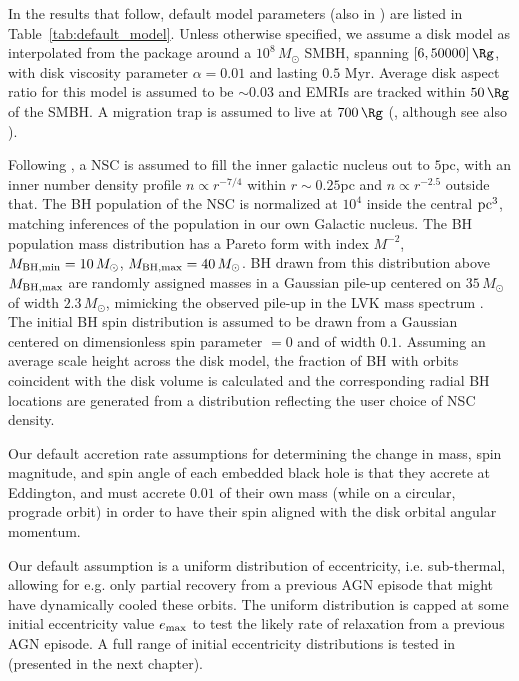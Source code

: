 In the results that follow, default model parameters (also in ) are listed in Table~\ref{tab:default_model}. Unless otherwise specified, we assume a \citet[][hereafter SG]{SirkoGoodman03} disk model as interpolated from the  package \citep{Gangardt+24-pAGN} around a $10^{8}\,M_{\odot}$ SMBH, spanning $[6,50000]\,\Rg$, with disk viscosity parameter $\alpha=0.01$ and lasting $0.5$ Myr. Average disk aspect ratio for this model is assumed to be $\sim 0.03$ and EMRIs are tracked within $50\,\Rg$ of the SMBH. A migration trap is assumed to live at $700\,\Rg$ (\citealt{Bellovary+16}, although see also \citealt{Grishin+23}). 

Following \citet{Generozov+18}, a NSC is assumed to fill the inner galactic nucleus out to $5$pc, with an inner number density profile $n\propto r^{-7/4}$ within $r\sim 0.25$pc and $n \propto r^{-2.5}$ outside that. The BH population of the NSC is normalized at $10^{4}$ inside the central ${\rm pc}^{3}$, matching inferences of the population in our own Galactic nucleus. The BH population mass distribution has a Pareto form with index $M^{-2}$, $M_{\rm BH, min}=10\,M_{\odot}$, $M_{\rm BH,max}=40\,M_{\odot}$. BH drawn from this distribution above $M_{\rm BH,max}$ are randomly assigned masses in a Gaussian pile-up centered on $35\,M_{\odot}$ of width $2.3\,M_{\odot}$, mimicking the observed pile-up in the LVK mass spectrum \citep{Abbott+23-massbump}. The initial BH spin distribution is assumed to be drawn from a Gaussian centered on dimensionless spin parameter $=0$ and of width $0.1$. Assuming an average scale height across the \citet{SirkoGoodman03} disk model, the fraction of BH with orbits coincident with the disk volume is calculated and the corresponding radial BH locations are generated from a distribution reflecting the user choice of NSC density.


Our default accretion rate assumptions for determining the change in mass, spin magnitude, and spin angle of each embedded black hole is that they accrete at Eddington, and must accrete $0.01$ of their own mass (while on a circular, prograde orbit) in order to have their spin aligned with the disk orbital angular momentum.
 
Our default assumption is a uniform distribution of eccentricity, i.e. sub-thermal, allowing for e.g. only partial recovery from a previous AGN episode that might have dynamically cooled these orbits. The uniform distribution is capped at some initial eccentricity value $e_{\rm max}$ to test the likely rate of relaxation from a previous AGN episode.
A full range of initial eccentricity distributions is tested in \citet{Cook+25} (presented in the next chapter).

